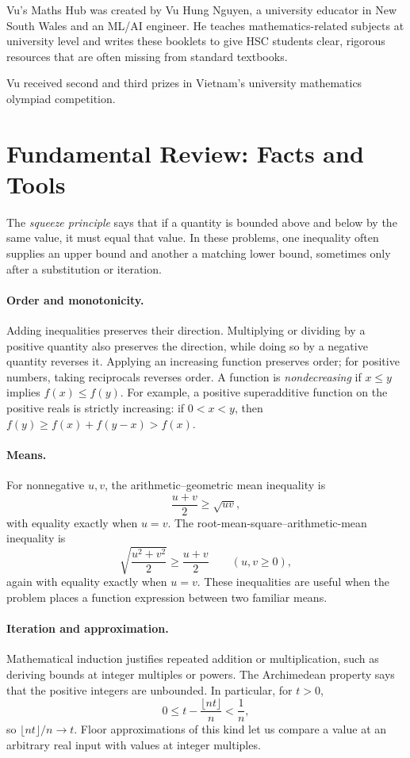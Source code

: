\documentclass[12pt,a4paper]{article}
\begin{document}
Vu's Maths Hub was created by Vu Hung Nguyen, a university educator in New
South Wales and an ML/AI engineer. He teaches mathematics-related subjects at
university level and writes these booklets to give HSC students clear,
rigorous resources that are often missing from standard textbooks.

Vu received second and third prizes in Vietnam's university mathematics
olympiad competition.

\section*{Fundamental Review: Facts and Tools}

The \emph{squeeze principle} says that if a quantity is bounded above and
below by the same value, it must equal that value. In these problems, one
inequality often supplies an upper bound and another a matching lower bound,
sometimes only after a substitution or iteration.

\paragraph{Order and monotonicity.}
Adding inequalities preserves their direction. Multiplying or dividing by a
positive quantity also preserves the direction, while doing so by a negative
quantity reverses it. Applying an increasing function preserves order; for
positive numbers, taking reciprocals reverses order. A function is
\emph{nondecreasing} if $x\le y$ implies $f(x)\le f(y)$. For example, a
positive superadditive function on the positive reals is strictly increasing:
if $0<x<y$, then $f(y)\ge f(x)+f(y-x)>f(x)$.

\paragraph{Means.}
For nonnegative $u,v$, the arithmetic--geometric mean inequality is
\[
\frac{u+v}{2}\ge\sqrt{uv},
\]
with equality exactly when $u=v$. The root-mean-square--arithmetic-mean
inequality is
\[
\sqrt{\frac{u^2+v^2}{2}}\ge\frac{u+v}{2}
\qquad (u,v\ge0),
\]
again with equality exactly when $u=v$. These inequalities are useful when
the problem places a function expression between two familiar means.

\paragraph{Iteration and approximation.}
Mathematical induction justifies repeated addition or multiplication, such as
deriving bounds at integer multiples or powers. The Archimedean property says
that the positive integers are unbounded. In particular, for $t>0$,
\[
0\le t-\frac{\lfloor nt\rfloor}{n}<\frac1n,
\]
so $\lfloor nt\rfloor/n\to t$. Floor approximations of this kind let us
compare a value at an arbitrary real input with values at integer multiples.
\end{document}
